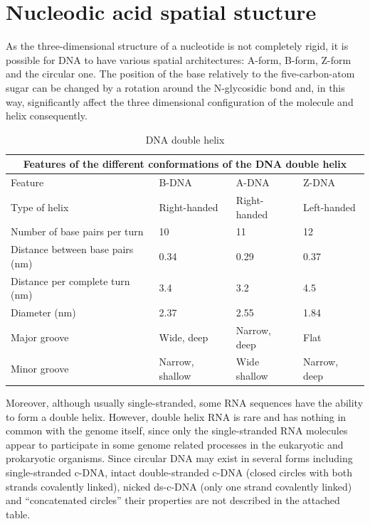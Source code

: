 \section{Nucleodic acid spatial stucture}

As the three-dimensional structure of a nucleotide is not completely rigid, it is possible for DNA to have various spatial architectures: 
A-form, B-form, Z-form and the circular one. The position of the base relatively to the five-carbon-atom sugar can be changed by a rotation 
around the N-glycosidic bond and, in this way, significantly affect the three dimensional configuration of the molecule and helix consequently.

\begin{table}[!ht]
	\caption{DNA double helix}\label{t:1}
	\smallskip
	\centering
	
	\begin{tabular}{ |p{3cm}||p{3cm}|p{3cm}|p{3cm}|  }
		\hline
		\multicolumn{4}{|c|}{Features of the different conformations of the DNA double helix} \\
		\hline
		Feature& B-DNA & A-DNA & Z-DNA\\
		\hline
		\hline
		Type of helix & Right-handed & Right-handed & Left-handed\\
		\hline
		Number of base pairs per turn & 10 & 11 & 12\\
		\hline
		Distance between base pairs (nm) & 0.34 & 0.29 & 0.37\\
		\hline
		Distance per complete turn (nm) & 3.4 & 3.2 & 4.5\\
		\hline
		Diameter (nm) & 2.37 & 2.55 & 1.84\\
		\hline
		Major groove & Wide, deep & Narrow, deep & Flat\\
		\hline
		Minor groove & Narrow, shallow & Wide shallow & Narrow, deep\\
		\hline
	\end{tabular}
\end{table}

Moreover, although usually single-stranded, some RNA sequences have the ability to form a double helix. 
However, double helix RNA is rare and has nothing in common with the genome itself, since only the 
single-stranded RNA molecules appear to participate in some genome related processes in the eukaryotic and prokaryotic organisms. 
Since circular DNA may exist in several forms including single-stranded c-DNA, intact double-stranded c-DNA (closed circles with both strands covalently linked), 
nicked ds-c-DNA (only one strand covalently linked) and “concatenated circles” their properties are not described in the attached table.

